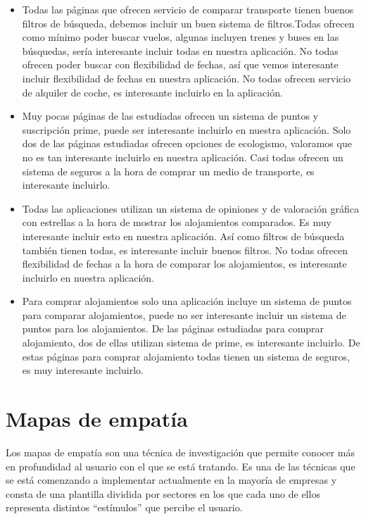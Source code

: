 \begin{itemize}
    \item Todas las páginas que ofrecen servicio de comparar transporte tienen buenos filtros de búsqueda, debemos incluir un buen sistema de filtros.Todas ofrecen como mínimo poder buscar vuelos, algunas incluyen trenes y buses en las búsquedas, sería interesante incluir todas en nuestra aplicación. No todas ofrecen poder buscar con flexibilidad de fechas, así que vemos interesante incluir flexibilidad de fechas en nuestra aplicación. No todas ofrecen servicio de alquiler de coche, es interesante incluirlo en la aplicación.
    \item Muy pocas páginas de las estudiadas ofrecen un sistema de puntos y suscripción prime, puede ser interesante incluirlo en nuestra aplicación. Solo dos de las páginas estudiadas ofrecen opciones de ecologismo, valoramos que no es tan interesante incluirlo en nuestra aplicación. Casi todas ofrecen un sistema de seguros a la hora de comprar un medio de transporte, es interesante incluirlo.
    \item Todas las aplicaciones utilizan un sistema de opiniones y de valoración gráfica con estrellas a la hora de mostrar los alojamientos comparados. Es muy interesante incluir esto en nuestra aplicación. Así como filtros de búsqueda también tienen todas, es interesante incluir buenos filtros. No todas ofrecen flexibilidad de fechas a la hora de comparar los alojamientos, es interesante incluirlo en nuestra aplicación.
    \item Para comprar alojamientos solo una aplicación incluye un sistema de puntos para comparar alojamientos, puede no ser interesante incluir un sistema de puntos para los alojamientos. De las páginas estudiadas para comprar alojamiento, dos de ellas utilizan sistema de prime, es interesante incluirlo. De estas páginas para comprar alojamiento todas tienen un sistema de seguros, es muy interesante incluirlo.
\end{itemize}

\section{Mapas de empatía}

Los mapas de empatía son una técnica de investigación que permite conocer más en profundidad al usuario con el que se está tratando. Es una de las técnicas que se está comenzando a implementar actualmente en la mayoría de empresas y consta de una plantilla dividida por sectores en los que cada uno de ellos representa distintos “estímulos” que percibe el usuario. \\

